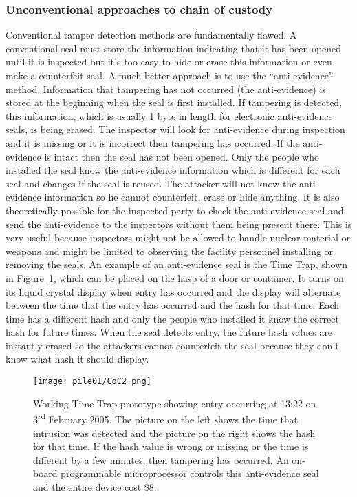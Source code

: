\documentclass[twoside,titlepage,11pt,twocolumn,a4paper]{article}
\begin{document}
\subsubsection{Unconventional approaches to chain of custody}

Conventional tamper detection methods are fundamentally flawed. A
conventional seal must store the information indicating that it has
been opened until it is inspected but it’s too easy to hide or erase
this information or even make a counterfeit seal. A much better
approach is to use the ``anti-evidence'' method. Information that
tampering has not occurred (the anti-evidence) is stored at the
beginning when the seal is first
installed. \citep{nuclearSafeguardsAndSec2005} If tampering is
detected, this information, which is usually 1 byte in length for
electronic anti-evidence seals, is being erased. 
\citep{unconventionalCoC2010}  The inspector will look for
anti-evidence during inspection and it is missing or it is incorrect
then tampering has occurred. If the anti-evidence is intact then the
seal has not been opened. Only the people who installed the seal know
the anti-evidence information which is different for each seal and
changes if the seal is reused. The attacker will not know the
anti-evidence information so he cannot counterfeit, erase or hide
anything. \citep{nuclearSafeguardsAndSec2005} It is also theoretically
possible for the inspected party to check the anti-evidence seal and
send the anti-evidence to the inspectors without them being present
there. \citep{unconventionalCoC2010} This is very useful because
inspectors might not be allowed to handle nuclear material or weapons
and might be limited to observing the facility personnel installing or
removing the seals. An example of an anti-evidence seal is the Time
Trap, shown in Figure~\ref{fig:CoC2}, which can be placed on the hasp
of a door or container. It turns on its liquid crystal display when
entry has occurred and the display will alternate between the time
that the entry has occurred and the hash for that time. Each time has
a different hash and only the people who installed it know the correct
hash for future times. When the seal detects entry, the future hash
values are instantly erased so the attackers cannot counterfeit the
seal because they don't know what hash it should
display. \citep{nuclearSafeguardsAndSec2005}

\begin{figure}
  \texttt{[image: pile01/CoC2.png]}
  \caption{Working Time Trap prototype showing entry occurring at
    13:22 on 3\textsuperscript{rd} February 2005. The picture on the
    left shows the time that intrusion was detected and the picture on
    the right shows the hash for that time. If the hash value is wrong
    or missing or the time is different by a few minutes, then
    tampering has occurred. An on-board programmable microprocessor
    controls this anti-evidence seal and the entire device cost
    \$8. \citep{nuclearSafeguardsAndSec2005}}
  \label{fig:CoC2}
\end{figure}
\end{document}
